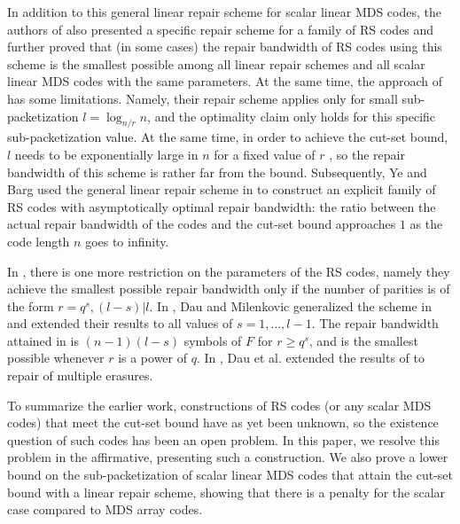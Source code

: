 \documentclass[11pt,onecolumn]{IEEEtran}
\begin{document}
In addition to this general linear repair scheme for scalar linear MDS codes, the authors of \cite{Guruswami16} also presented a specific repair scheme for a family of RS codes and further proved that (in some cases) the repair bandwidth of 
RS codes using this scheme is the smallest possible among all linear repair schemes and all scalar linear MDS codes with the same 
parameters. 
At the same time, the approach of \cite{Guruswami16} has some limitations. 
Namely, their repair scheme applies only for small sub-packetization $l=\log_{n/r} n$, and the optimality claim only holds for this specific sub-packetization value.  At the same time, in order to achieve the cut-set bound, $l$ needs to be exponentially large in $n$ for a fixed 
value of $r$ \cite{Goparaju14}, so the repair bandwidth of this scheme is rather far from the bound.
Subsequently, Ye and Barg \cite{Ye16b} used the general linear repair scheme in 
\cite{Guruswami16} to construct an explicit family of RS codes with asymptotically optimal repair bandwidth: the ratio between the actual 
repair bandwidth of the codes and the cut-set bound approaches $1$
as the code length $n$ goes to infinity. 

In \cite{Guruswami16}, there is one more restriction on the parameters of the RS codes, namely they achieve the smallest possible
repair bandwidth only if the number of parities is of the form $r=q^s,(l-s)|l.$ In \cite{Dau17}, Dau and Milenkovic generalized the scheme in \cite{Guruswami16} and extended their
results to all values of $s=1,\dots,l-1$. The repair bandwidth attained in \cite{Dau17} is $(n-1)(l-s)$ symbols of $F$
 for $r\ge q^s$, and is the smallest possible whenever $r$ is a power of $q.$ In \cite{Dau16}, Dau et al. extended the results of \cite{Guruswami16} to repair of multiple erasures.

To summarize the earlier work, constructions of RS codes (or any scalar MDS codes) that meet the cut-set bound have as yet been unknown, so the existence question of such codes has been an open problem. In this paper, we resolve this problem in the affirmative, presenting such a construction. We also prove a lower bound on the sub-packetization of scalar linear MDS codes that attain the cut-set bound with a linear repair scheme, showing that there is a penalty for the scalar case compared to MDS array codes.
\end{document}
